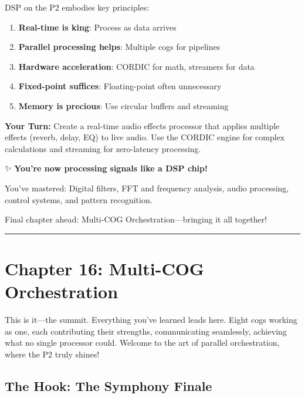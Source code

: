 \documentclass[11pt]{book}
\providecommand{\tightlist}{%
  \setlength{\itemsep}{0pt}\setlength{\parskip}{0pt}}
\begin{document}
DSP on the P2 embodies key principles:

\begin{enumerate}
\def\labelenumi{\arabic{enumi}.}
\tightlist
\item
  \textbf{Real-time is king}: Process as data arrives
\item
  \textbf{Parallel processing helps}: Multiple cogs for pipelines
\item
  \textbf{Hardware acceleration}: CORDIC for math, streamers for data
\item
  \textbf{Fixed-point suffices}: Floating-point often unnecessary
\item
  \textbf{Memory is precious}: Use circular buffers and streaming
\end{enumerate}

\textbf{Your Turn:} Create a real-time audio effects processor that
applies multiple effects (reverb, delay, EQ) to live audio. Use the
CORDIC engine for complex calculations and streaming for zero-latency
processing.

\begin{chapterend}
✨ \textbf{You're now processing signals like a DSP chip!}

You've mastered: Digital filters, FFT and frequency analysis, audio processing, control systems, and pattern recognition.

Final chapter ahead: Multi-COG Orchestration—bringing it all together!
\end{chapterend}

\begin{center}\rule{0.5\linewidth}{0.5pt}\end{center}

\hypertarget{chapter-16-multi-cog-orchestration}{%
\section{Chapter 16: Multi-COG
Orchestration}\label{chapter-16-multi-cog-orchestration}}

This is it---the summit. Everything you've learned leads here. Eight
cogs working as one, each contributing their strengths, communicating
seamlessly, achieving what no single processor could. Welcome to the art
of parallel orchestration, where the P2 truly shines!

\hypertarget{the-hook-the-symphony-finale}{%
\subsection{The Hook: The Symphony
Finale}\label{the-hook-the-symphony-finale}}
\end{document}
